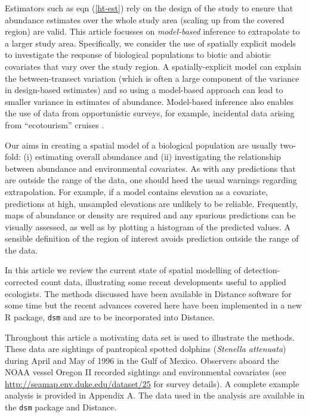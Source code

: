 \documentclass[a4paper,12pt]{article}
\begin{document}
Estimators such as eqn (\ref{ht-est}) rely on the design of the study to ensure that abundance estimates over the whole study area (scaling up from the covered region) are valid. This article focusses on \textit{model-based} inference to extrapolate to a larger study area. Specifically, we consider the use of spatially explicit models to investigate the response of biological populations to biotic and abiotic covariates that vary over the study region. A spatially-explicit model can explain the between-transect variation (which is often a large component of the variance in design-based estimates) and so using a model-based approach can lead to smaller variance in estimates of abundance. Model-based inference also enables the use of data from opportunistic surveys, for example, incidental data arising from ``ecotourism'' cruises \citep{Williams:2006tz}. 

Our aims in creating a spatial model of a biological population are usually two-fold: (i) estimating overall abundance and (ii) investigating the relationship between abundance and environmental covariates. As with any predictions that are outside the range of the data, one should heed the usual warnings regarding extrapolation. For example, if a model contains elevation as a covariate, predictions at high, unsampled elevations are unlikely to be reliable. Frequently, maps of abundance or density are required and any spurious predictions can be visually assessed, as well as by plotting a histogram of the predicted values. A sensible definition of the region of interest avoids prediction outside the range of the data.

In this article we review the current state of spatial modelling of detection-corrected count data, illustrating some recent developments useful to applied ecologists. The methods discussed have been available in Distance software \citep{Thomas:2010cf} for some time but the recent advances covered here have been implemented in a new \textsf{R} package, \texttt{dsm} \citep{Miller:2013to}  and are to be incorporated into Distance.

Throughout this article a motivating data set is used to illustrate the methods. These data are sightings of pantropical spotted dolphins (\textit{Stenella attenuata}) during April and May of 1996 in the Gulf of Mexico.  Observers aboard the NOAA vessel Oregon II recorded sightings and environmental covariates (see \mbox{\url{http://seamap.env.duke.edu/dataset/25}} for survey details). A complete example analysis is provided in Appendix A. The data used in the analysis are available in the \texttt{dsm} package and Distance.
\end{document}
